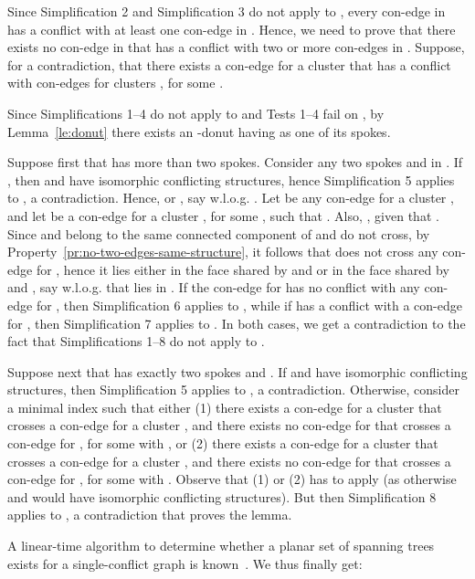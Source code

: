 \documentclass[letter,runningheads]{llncs}
\renewenvironment{proof}
{{\em Proof.\ }}{\hspace*{\fill}\par\vspace{2mm}}
\begin{document}
\begin{proof}
Since {\sc Simplification 2} and {\sc Simplification 3} do not apply to , every con-edge in  has a conflict with at least one con-edge in . Hence, we need to prove that there exists no con-edge in  that has a conflict with two or more con-edges in . Suppose, for a contradiction, that there exists a con-edge  for a cluster  that has a conflict with con-edges for clusters , for some .

Since {\sc Simplifications 1--4} do not apply to  and {\sc Tests 1--4} fail on , by Lemma~\ref{le:donut} there exists an -donut  having  as one of its spokes.

Suppose first that  has more than two spokes. Consider any two spokes  and  in . If , then  and  have isomorphic conflicting structures, hence {\sc Simplification 5} applies to , a contradiction. Hence,  or , say w.l.o.g. . Let  be any con-edge for a cluster , and let  be a con-edge for a cluster , for some , such that . Also, , given that . Since  and  belong to the same connected component of  and do not cross, by Property~\ref{pr:no-two-edges-same-structure}, it follows that  does not cross any con-edge for , hence it lies either in the face  shared by  and  or in the face  shared by  and , say w.l.o.g. that  lies in . If the con-edge  for  has no conflict with any con-edge for , then {\sc Simplification 6} applies to , while if  has a conflict with a con-edge for , then {\sc Simplification 7} applies to . In both cases, we get a contradiction to the fact that {\sc Simplifications 1--8} do not apply to .

Suppose next that  has exactly two spokes  and . If  and  have isomorphic conflicting structures, then {\sc Simplification 5} applies to , a contradiction. Otherwise, consider a minimal index  such that either (1) there exists a con-edge  for a cluster  that crosses a con-edge  for a cluster  , and there exists no con-edge  for  that crosses a con-edge  for , for some  with , or (2) there exists a con-edge  for a cluster  that crosses a con-edge  for a cluster  , and there exists no con-edge  for  that crosses a con-edge  for , for some  with . Observe that (1) or (2) has to apply (as otherwise  and  would have isomorphic conflicting structures). But then {\sc Simplification 8} applies to , a contradiction that proves the lemma.
\end{proof}

A linear-time algorithm to determine whether a planar set  of spanning trees exists for a single-conflict graph is known~\cite{df-ectefcgsf-09}. We thus finally get:
\end{document}

